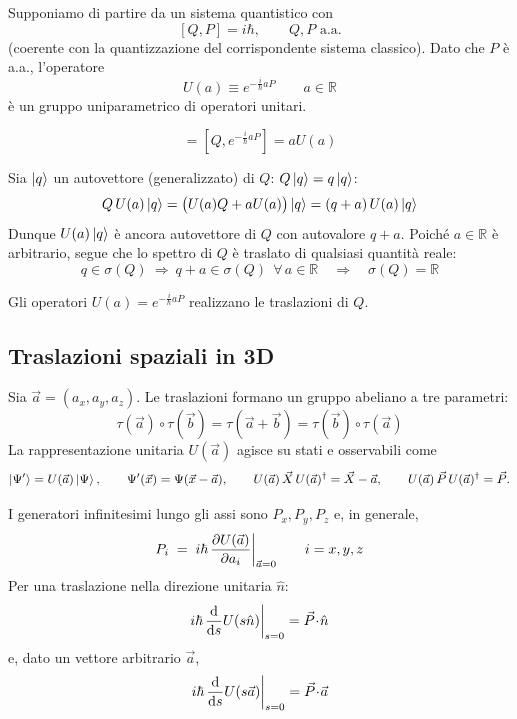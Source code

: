 Supponiamo di partire da un sistema quantistico con
\[
    [Q,P]= i\hbar , \qquad Q,P \text{ a.a.}
\]
(coerente con la quantizzazione del corrispondente sistema classico).
Dato che \(P\) è a.a., l’operatore
\begin{equation}
    U(a)\equiv e^{-\frac{i}{\hbar}aP} \qquad a\in\mathbb{R}
\end{equation}
è un gruppo uniparametrico di operatori unitari.

\begin{equation}
    [Q,U(a)] =\left[ Q, e^{-\frac{i}{\hbar}aP} \right]     = aU(a)
\end{equation}


Sia \(\ket{q}\) un autovettore (generalizzato) di \(Q\): \(Q\ket{q}=q\ket{q}\): 
\[
    Q\,U(a)\ket{q}= \bigl(U(a)Q + aU(a)\bigr)\ket{q}
    = (q+a)\,U(a)\ket{q}
\]
Dunque \(U(a)\ket{q}\) è ancora autovettore di \(Q\) con autovalore \(q+a\).
Poiché \(a\in\mathbb{R}\) è arbitrario, segue che lo spettro di \(Q\) è traslato di qualsiasi quantità reale:
\[
    q\in\sigma(Q)\ \Longrightarrow\ q+a\in\sigma(Q)\ \ \forall\,a\in\mathbb{R}
    \quad\Longrightarrow\quad \sigma(Q)=\mathbb{R}
\]


Gli operatori \(U(a)=e^{-\frac{i}{\hbar}aP}\) realizzano le traslazioni di \(Q\).


\subsection{Traslazioni spaziali in 3D}

Sia \(\vec a=(a_x,a_y,a_z)\). Le traslazioni formano un gruppo abeliano a tre parametri:
\[
\tau(\vec a)\circ\tau(\vec b)=\tau(\vec a+\vec b)=\tau(\vec b)\circ \tau(\vec a)
\]
La rappresentazione unitaria \(U(\vec a)\) agisce su stati e osservabili come
\[
\ket{\Psi'}=U(\vec a)\ket{\Psi}, 
\qquad \Psi'(\vec x)=\Psi(\vec x-\vec a), 
\qquad U(\vec a)\,\vec X\,U(\vec a)^\dagger=\vec X-\vec a, 
\qquad U(\vec a)\,\vec P\,U(\vec a)^\dagger=\vec P .
\]

I generatori infinitesimi lungo gli assi sono \(P_x,P_y,P_z\) e, in generale,
\begin{equation}
    P_i \;=\; i\hbar\,\pdv{U(\vec a)}{a_i}\bigg|_{\vec a=0}\qquad i=x,y,z
\end{equation}
Per una traslazione nella direzione unitaria \(\hat n\):
\[
i\hbar\,\dv{s}U(s\hat n)\bigg|_{s=0}= \vec P\!\cdot\!\hat n
\]
e, dato un vettore arbitrario \(\vec a\),
\[
i\hbar\,\dv{s}U(s\vec a)\bigg|_{s=0}= \vec P\!\cdot\!\vec a
\]


